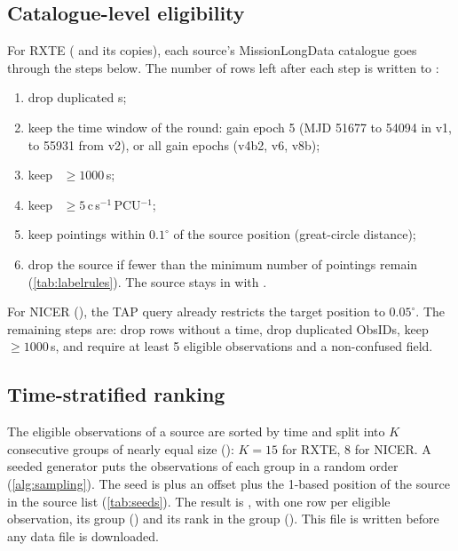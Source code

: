 \subsection{Catalogue-level eligibility}\label{sec:eligibility}
For RXTE ( and its copies), each source's MissionLongData catalogue goes through the steps
below. The number of rows left after each step is written to :
\begin{enumerate}
\item drop duplicated s;
\item keep the time window of the round: gain epoch 5 (MJD 51677 to 54094 in v1, to 55931 from v2), or all gain epochs
(v4b2, v6, v8b);
\item keep ~$\ge1000$\,s;
\item keep ~$\ge5$\,c\,s$^{-1}$\,PCU$^{-1}$;
\item keep pointings within $0.1^\circ$ of the source position (great-circle distance);
\item drop the source if fewer than the minimum number of pointings remain (\cref{tab:labelrules}). The source stays in
 with .
\end{enumerate}
For NICER (), the TAP query already restricts the target position to $0.05^\circ$. The remaining
steps are: drop rows without a time, drop duplicated ObsIDs, keep ~$\ge1000$\,s, and require at least 5
eligible observations and a non-confused field.

\subsection{Time-stratified ranking}\label{sec:ranking}
The eligible observations of a source are sorted by time and split into $K$ consecutive groups of nearly equal size
(): $K=15$ for RXTE, 8 for NICER. A seeded generator puts the observations of each group in a
random order (\cref{alg:sampling}). The seed is  plus an offset plus the 1-based position of the source in the
source list (\cref{tab:seeds}). The result is , with one row per eligible
observation, its group () and its rank in the group (). This file is written before any
data file is downloaded.

